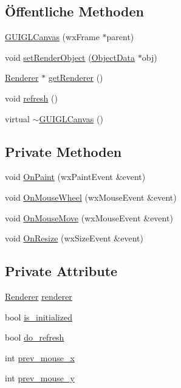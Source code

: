 \subsection*{Öffentliche Methoden}
\begin{DoxyCompactItemize}
\item 
\hyperlink{classGUIGLCanvas_ae77992061b501fa995c08cd568c2c6ad}{G\-U\-I\-G\-L\-Canvas} (wx\-Frame $\ast$parent)
\item 
void \hyperlink{classGUIGLCanvas_a643f11a7ef05829a6c48d037ad2c4b9b}{set\-Render\-Object} (\hyperlink{classObjectData}{Object\-Data} $\ast$obj)
\item 
\hyperlink{classRenderer}{Renderer} $\ast$ \hyperlink{classGUIGLCanvas_a57085ce831e09e627fe93f17a6c79dfa}{get\-Renderer} ()
\item 
void \hyperlink{classGUIGLCanvas_a883d5bc79fcfc6e2c9ceeb41a0c0e77e}{refresh} ()
\item 
virtual \hyperlink{classGUIGLCanvas_af6358f8d4e95c6864ff005d4764fffbc}{$\sim$\-G\-U\-I\-G\-L\-Canvas} ()
\end{DoxyCompactItemize}
\subsection*{Private Methoden}
\begin{DoxyCompactItemize}
\item 
void \hyperlink{classGUIGLCanvas_a83f52d08591920a339150c2f45069c8f}{On\-Paint} (wx\-Paint\-Event \&event)
\item 
void \hyperlink{classGUIGLCanvas_a0ee8fe9339ebb330b8133a620bd67514}{On\-Mouse\-Wheel} (wx\-Mouse\-Event \&event)
\item 
void \hyperlink{classGUIGLCanvas_a9c089336b9485f1abcc60a1a7fb85bb7}{On\-Mouse\-Move} (wx\-Mouse\-Event \&event)
\item 
void \hyperlink{classGUIGLCanvas_aba4aa683bf8226da8182779de38ef5db}{On\-Resize} (wx\-Size\-Event \&event)
\end{DoxyCompactItemize}
\subsection*{Private Attribute}
\begin{DoxyCompactItemize}
\item 
\hyperlink{classRenderer}{Renderer} \hyperlink{classGUIGLCanvas_a33a4ad3bc364d697396c55d011bfac44}{renderer}
\item 
bool \hyperlink{classGUIGLCanvas_a59e01564652765dec69e7097c10b4455}{is\-\_\-initialized}
\item 
bool \hyperlink{classGUIGLCanvas_a7139f37aa028f71e393a0c479299455d}{do\-\_\-refresh}
\item 
int \hyperlink{classGUIGLCanvas_afc22c47a62b8d5b165a22d059816ee22}{prev\-\_\-mouse\-\_\-x}
\item 
int \hyperlink{classGUIGLCanvas_a684c82bd591f01b5f600c9589158e0e0}{prev\-\_\-mouse\-\_\-y}
\end{DoxyCompactItemize}


